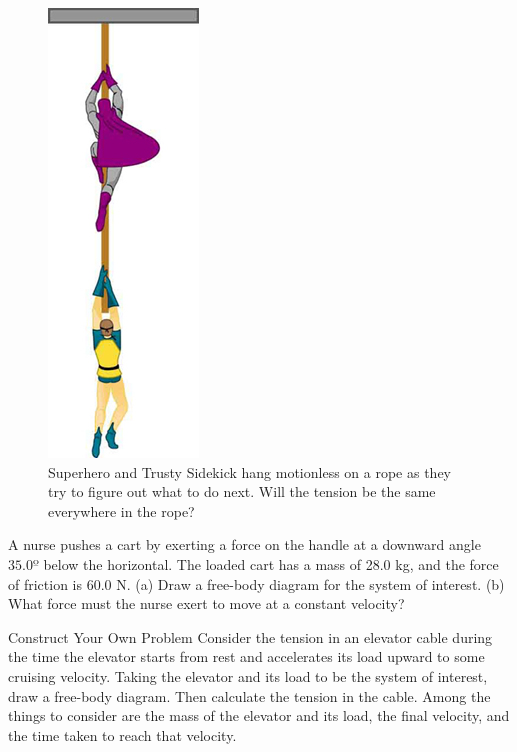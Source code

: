 \documentclass[
]{book}
\newenvironment{problems-exercises}{}{}
\newenvironment{tinysection}{}{}
\begin{document}
\begin{problems-exercises}
\begin{figure}
\hypertarget{import-auto-id1655793}{%
\centering
\includegraphics{images/Figure_04_06_08.jpg}
\caption{Superhero and Trusty Sidekick hang motionless on a rope as they try to
figure out what to do next. Will the tension be the same everywhere in
the rope?}\label{import-auto-id1655793}
}
\end{figure}

\hypertarget{fs-id1552077}{}
\leavevmode\hypertarget{fs-id2639727}{}%
A nurse pushes a cart by exerting a force on the handle at a downward
angle \(\text{35.0º}{}\) below the horizontal. The loaded cart has a mass
of 28.0 kg, and the force of friction is 60.0 N. (a) Draw a free-body
diagram for the system of interest. (b) What force must the nurse exert
to move at a constant velocity?

\hypertarget{fs-id2654456}{}
\hypertarget{fs-id1238679}{}
\begin{tinysection}

{Construct Your Own Problem} Consider the tension in
an elevator cable during the time the elevator starts from rest and
accelerates its load upward to some cruising velocity. Taking the
elevator and its load to be the system of interest, draw a free-body
diagram. Then calculate the tension in the cable. Among the things to
consider are the mass of the elevator and its load, the final velocity,
and the time taken to reach that velocity.


\end{tinysection}
\end{problems-exercises}
\end{document}
